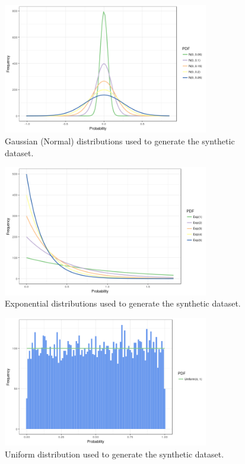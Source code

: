 \begin{figure}[H]
    \centering
    \includegraphics[width=0.8\textwidth]{img/gld_clustering/extra_images/5_gaussian.png}
    \caption{Gaussian (Normal) distributions used to generate the synthetic dataset.}
    \label{fig:5_gaussian}
\end{figure}

\begin{figure}[H]
    \centering
    \includegraphics[width=0.8\textwidth]{img/gld_clustering/extra_images/5_exp.png}
    \caption{Exponential distributions used to generate the synthetic dataset.}
    \label{fig:5_exp}
\end{figure}

\begin{figure}[H]
    \centering
    \includegraphics[width=0.8\textwidth]{img/gld_clustering/extra_images/uniform.png}
    \caption{Uniform distribution used to generate the synthetic dataset.}
    \label{fig:uniform}
\end{figure}

